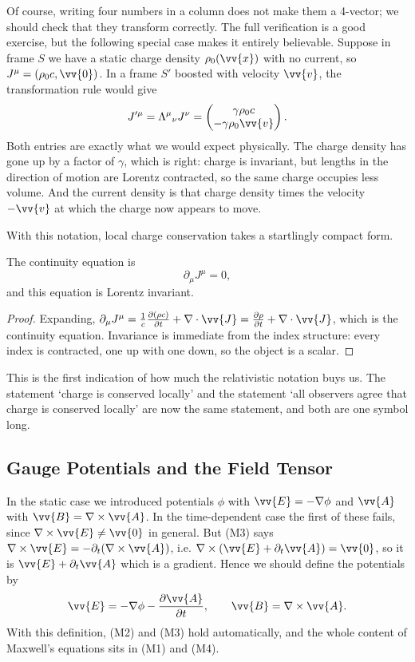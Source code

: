 Of course, writing four numbers in a column does not make them a 4-vector; we should check that they transform correctly. The full verification is a good exercise, but the following special case makes it entirely believable. Suppose in frame $S$ we have a static charge density $\rho_0(\vv{x})$ with no current, so $J^\mu = (\rho_0 c, \vv{0})$. In a frame $S'$ boosted with velocity $\vv{v}$, the transformation rule would give
$$
J'^\mu = \Lambda^\mu{}_\nu J^\nu = \begin{pmatrix} \gamma\rho_0 c\\ -\gamma\rho_0 \vv{v}\end{pmatrix}.
$$
Both entries are exactly what we would expect physically. The charge density has gone up by a factor of $\gamma$, which is right: charge is invariant, but lengths in the direction of motion are Lorentz contracted, so the same charge occupies less volume. And the current density is that charge density times the velocity $-\vv{v}$ at which the charge now appears to move.

With this notation, local charge conservation takes a startlingly compact form.

\begin{proposition}
	The continuity equation is
	$$
	\partial_\mu J^\mu = 0,
	$$
	and this equation is Lorentz invariant.
\end{proposition}
\begin{proof}
	Expanding, $\partial_\mu J^\mu = \frac{1}{c}\frac{\partial (\rho c)}{\partial t} + \nabla\cdot\vv{J} = \frac{\partial \rho}{\partial t} + \nabla\cdot \vv{J}$, which is the continuity equation. Invariance is immediate from the index structure: every index is contracted, one up with one down, so the object is a scalar.
\end{proof}

This is the first indication of how much the relativistic notation buys us. The statement `charge is conserved locally' and the statement `all observers agree that charge is conserved locally' are now the same statement, and both are one symbol long.

\subsection{Gauge Potentials and the Field Tensor}

In the static case we introduced potentials $\phi$ with $\vv{E} = -\nabla\phi$ and $\vv{A}$ with $\vv{B} = \nabla\times\vv{A}$. In the time-dependent case the first of these fails, since $\nabla\times\vv{E} \neq \vv{0}$ in general. But (M3) says $\nabla\times \vv{E} = -\partial_t(\nabla\times\vv{A})$, i.e. $\nabla\times(\vv{E} + \partial_t \vv{A}) = \vv{0}$, so it is $\vv{E}+\partial_t\vv{A}$ which is a gradient. Hence we should define the potentials by
$$
\vv{E} = -\nabla\phi - \frac{\partial \vv{A}}{\partial t}, \qquad \vv{B} = \nabla\times\vv{A}.
$$
With this definition, (M2) and (M3) hold automatically, and the whole content of Maxwell's equations sits in (M1) and (M4).

